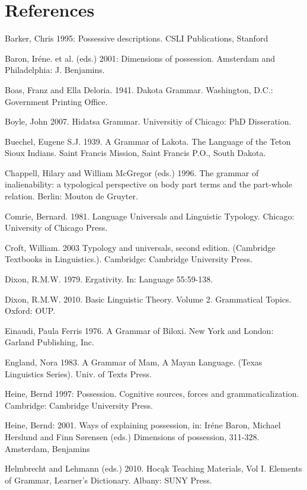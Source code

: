 \documentclass[output=paper]{LSP/langsci}
\begin{document}
\section*{References}
 \printbibliography[heading=subbibliography,notkeyword=this]

\begin{reflist}

Barker, Chris 1995: Possessive descriptions. CSLI Publications, Stanford

Baron, Iréne. et al. (eds.) 2001: Dimensions of possession. Amsterdam and Philadelphia: J. Benjamins.

Boas, Franz and Ella Deloria. 1941. Dakota Grammar. Washington, D.C.: Government Printing Office.

Boyle, John 2007. Hidatsa Grammar. Universitiy of Chicago: PhD Disseration.

Buechel, Eugene S.J. 1939. A Grammar of Lakota. The Language of the Teton Sioux Indians. Saint Francis Mission, Saint Francis P.O., South Dakota.

Chappell, Hilary and William McGregor (eds.) 1996. The grammar of inalienability: a typological perspective on body part terms and the part-whole relation. Berlin: Mouton de Gruyter.

Comrie, Bernard. 1981. Language Universals and Linguistic Typology. Chicago: University of Chicago Press.

Croft, William. 2003 Typology and universals, second edition. (Cambridge Textbooks in Linguistics.). Cambridge: Cambridge University Press.

Dixon, R.M.W. 1979. Ergativity. In: Language 55:59-138.

Dixon, R.M.W. 2010. Basic Linguistic Theory. Volume 2. Grammatical Topics. Oxford: OUP.

Einaudi, Paula Ferris 1976. A Grammar of Biloxi. New York and London: Garland Publishing, Inc.

England, Nora 1983. A Grammar of Mam, A Mayan Language. (Texas Linguistics Series). Univ. of Texts Press.

Heine, Bernd 1997: Possession. Cognitive sources, forces and grammaticalization. Cambridge: Cambridge University Press.

Heine, Bernd: 2001. Ways of explaining possession, in: Iréne Baron, Michael Herslund and Finn Sørensen (eds.) Dimensions of possession, 311-328. Amsterdam, Benjamins

Helmbrecht and Lehmann (eds.) 2010. Hoc\k{a}k Teaching Materials, Vol I. Elements of Grammar, Learner's Dictionary. Albany: SUNY Press.


\end{reflist}
\end{document}
